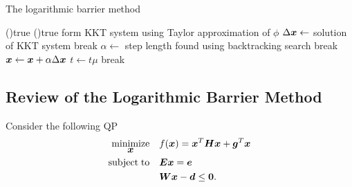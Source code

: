 \begin{algorithm}[ht]
    \label{alg.logbar}
    \DontPrintSemicolon

    \caption{The logarithmic barrier method}


    \BlankLine

    \While(){true}
    {
        \While(){true}
        {
            form \acs{KKT} system using Taylor approximation of $\phi$ \; 
            $\Delta \mbox{\boldmath $x$} \gets$ solution of \acs{KKT} system \;
            {
                break 
            }
            $\alpha \gets$ step length found using backtracking search\;
            \If {$\alpha < \epsilon$}
            {
                break 
            }
            $\mbox{\boldmath $x$} \gets \mbox{\boldmath $x$} + \alpha \Delta \mbox{\boldmath $x$}$
        }
        \BlankLine
        $t \gets t\mu$\;
        {
            break 
        }
    }
\end{algorithm}


\subsection{Review of the Logarithmic Barrier Method}
Consider the following \ac{QP}
\begin{equation*}
\begin{split}
    \underset{\mbox{\boldmath $x$}}{\operatorname{minimize}}\quad  & f(\mbox{\boldmath $x$}) = \mbox{\boldmath $x$}^T \mbox{\boldmath $H$} \mbox{\boldmath $x$}  + \mbox{\boldmath $g$}^T\mbox{\boldmath $x$}\\
    {\operatorname{subject\;to}}\quad          & \mbox{\boldmath $E$}\mbox{\boldmath $x$} = \mbox{\boldmath $e$} \\
                        & \mbox{\boldmath $W$}\mbox{\boldmath $x$} - \mbox{\boldmath $d$} \le \mbox{\boldmath $0$}.
\end{split}
\end{equation*}


